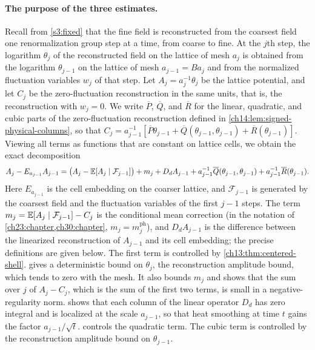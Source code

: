 \paragraph{The purpose of the three estimates.}
Recall from \cref{s3:fixed} that the fine field is reconstructed from the coarsest field one renormalization group step at a time, from coarse to fine. At the $j$th step, the logarithm $\theta_j$ of the reconstructed field on the lattice of mesh $a_j$ is obtained from the logarithm $\theta_{j-1}$ on the lattice of mesh $a_{j-1}=Ba_j$ and from the normalized fluctuation variables $w_j$ of that step. Let $A_j=a_j^{-1}\theta_j$ be the lattice potential, and let $C_j$ be the zero-fluctuation reconstruction in the same units, that is, the reconstruction with $w_j=0$. We write $\overline P$, $\overline Q$, and $\overline R$ for the linear, quadratic, and cubic parts of the zero-fluctuation reconstruction defined in \cref{ch14:lem:signed-physical-columns}, so that $C_j=a_{j-1}^{-1}[\overline P\theta_{j-1}+\overline Q(\theta_{j-1},\theta_{j-1})+\overline R(\theta_{j-1})]$. Viewing all terms as functions that are constant on lattice cells, we obtain the exact decomposition
\begin{equation}\label{ch14:eq:increment-decomposition}
 A_j-E_{a_{j-1}}A_{j-1}
 =\bigl(A_j-\mathbb E[A_j\mid\mathcal F_{j-1}]\bigr)+m_j+D_dA_{j-1}
 +a_{j-1}^{-1}\overline Q(\theta_{j-1},\theta_{j-1})+a_{j-1}^{-1}\overline R(\theta_{j-1}).
\end{equation}
Here $E_{a_{j-1}}$ is the cell embedding on the coarser lattice, and $\mathcal F_{j-1}$ is generated by the coarsest field and the fluctuation variables of the first $j-1$ steps. The term $m_j=\mathbb E[A_j\mid\mathcal F_{j-1}]-C_j$ is the conditional mean correction (in the notation of \cref{ch23:chapter,ch30:chapter}, $m_j=m_j^{\mathrm{ph}}$), and $D_dA_{j-1}$ is the difference between the linearized reconstruction of $A_{j-1}$ and its cell embedding; the precise definitions are given below. The first term is controlled by \cref{ch13:thm:centered-shell}.  gives a deterministic bound on $\theta_j$, the reconstruction amplitude bound, which tends to zero with the mesh. It also bounds $m_j$ and shows that the sum over $j$ of $A_j-C_j$, which is the sum of the first two terms, is small in a negative-regularity norm.  shows that each column of the linear operator $D_d$ has zero integral and is localized at the scale $a_{j-1}$, so that heat smoothing at time $t$ gains the factor $a_{j-1}/\sqrt t$.  controls the quadratic term. The cubic term is controlled by the reconstruction amplitude bound on $\theta_{j-1}$.

